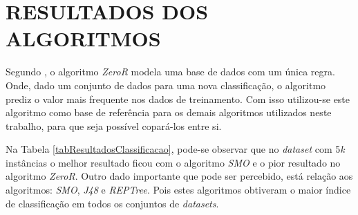\documentclass[
	12pt,				%
	openright,			%
	oneside,	
	a4paper,				%
	english,				%
	brazil				%
]{abntex2/abntex2} %
\begin{document}
	\section{RESULTADOS DOS ALGORITMOS}
	
	Segundo \cite{witten:2011}, o algoritmo \textit{ZeroR} modela uma base de dados com um única regra. Onde, dado um conjunto de dados para uma nova classificação, o algoritmo prediz o valor mais frequente nos dados de treinamento. Com isso utilizou-se este algoritmo como base de referência para os demais algoritmos utilizados neste trabalho, para que seja possível copará-los entre si.
	
	Na Tabela \ref{tabResultadosClassificacao}, pode-se observar que no \textit{dataset} com 5\textit{k} instâncias o melhor resultado ficou com o algoritmo \textit{SMO} e o pior resultado no algoritmo \textit{ZeroR}. Outro dado importante que pode ser percebido, está relação aos algoritmos: \textit{SMO}, \textit{J48} e \textit{REPTree}. Pois estes algoritmos obtiveram o maior índice de classificação em todos os conjuntos de \textit{datasets}.
	\\
	
\end{document}
